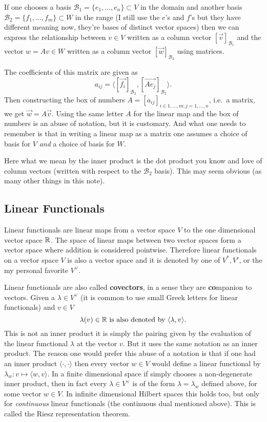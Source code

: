 \documentclass[12pt]{amsart}
\begin{document}
If one chooses a basis $\mathcal{B}_1 = \{e_1, \ldots, e_n\}\subset V$ in the domain and another basis $\mathcal{B}_2 = \{f_1, \ldots, f_m\} \subset W$ in the range (I still use the $e$'s and $f$'s but they have different meaning now, they're bases of distinct vector spaces) then we can express the relationship between $v \in V$ written as a column vector $[\vec{v}]_{\mathcal{B}_1}$ and the vector $w = Av \in W$ written as a column vector $[\vec{w}]_{\mathcal{B}_2}$ using matrices.

The coefficients of this matrix are given as
\[
	a_{ij} = \langle [\vec{f_i}]_{\mathcal{B}_2}, [\vec{A e_j}]_{\mathcal{B}_2} \rangle.
\]
Then constructing the box of numbers $A = [a_{ij}]_{i\in 1, \ldots, m; j = 1, \ldots, n}$, i.e.\ a matrix, we get $\vec{w} = A \vec{v}$. Using the same letter $A$ for the linear map and the box of numbers is an abuse of notation, but it is customary. And what one needs to remember is that in writing a linear map as a matrix one assumes a choice of basis for $V$ \emph{and} a choice of basis for $W$.

Here what we mean by the inner product is the dot product you know and love of column vectors (written with respect to the $\mathcal{B}_2$ basis). This may seem obvious (as many other things in this note).



\subsection*{Linear Functionals}

Linear functionals are linear maps from a vector space $V$ to the one dimensional vector space $\mathbb{R}$. The space of linear maps between two vector spaces form a vector space where addition is considered pointwise. Therefore linear functionals on a vector space $V$ is also a vector space and it is denoted by one of $V^*, V'$, or the my personal favorite $V^\vee$. 


Linear functionals are also called {\bf covectors},  in a sense they are {\bf co}mpanion to vectors. Given a $\lambda \in V^\vee$ (it is common to use small Greek letters for linear functionals) and $v \in V$ 
\begin{equation}\label{eq:pairing}
	\lambda(v) \in \mathbb{R} \text{ is also denoted by } \langle \lambda, v \rangle.
\end{equation} 
This is not an inner product it is simply the pairing given by the evaluation of the linear functional $\lambda$ at the vector $v$. But it uses the same notation as an inner product. The reason one would prefer this abuse of a notation is that if one had an inner product $\langle \cdot, \cdot \rangle $ then every vector $w\in V$ would define a linear functional by $\lambda_w : v \mapsto \langle w, v \rangle$. In a finite dimensional space if simply chooses a non-degenerate inner product, then in fact every $\lambda \in V^\vee$ is of the form $\lambda = \lambda_w$ defined above, for some vector $w \in V$.  In infinite dimensional Hilbert spaces this holds too, but only for \emph{continuous} linear functionals (the continuous dual mentioned above). This is called the Riesz representation theorem.
\end{document}
